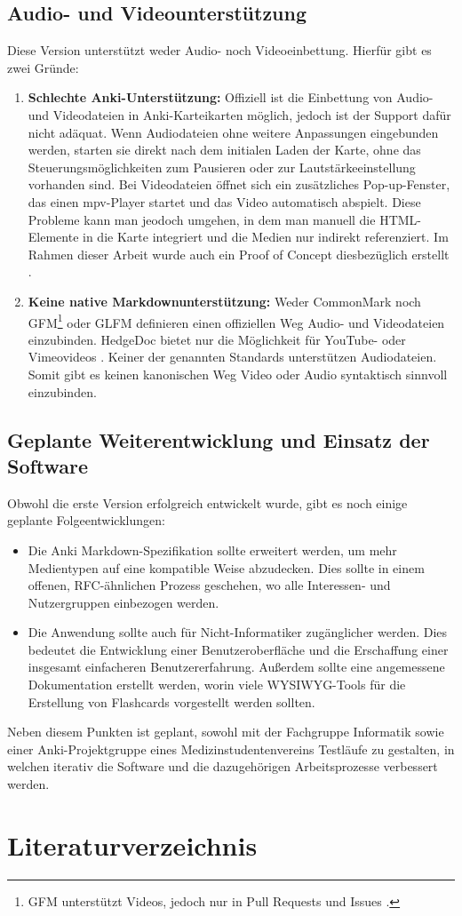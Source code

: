 \documentclass[ngerman]{article}
\begin{document}
\subsection{Audio- und Videounterst\"utzung}
Diese Version unterstützt weder Audio- noch Videoeinbettung. Hierfür gibt es zwei Gründe:
\begin{enumerate}
  \item \textbf{Schlechte Anki-Unterstützung:} Offiziell ist die Einbettung von Audio- und Videodateien in Anki-Karteikarten möglich, jedoch ist der Support dafür nicht adäquat. Wenn Audiodateien ohne weitere Anpassungen eingebunden werden, starten sie direkt nach dem initialen Laden der Karte, ohne das Steuerungsmöglichkeiten zum Pausieren oder zur Lautstärkeeinstellung vorhanden sind. Bei Videodateien öffnet sich ein zusätzliches Pop-up-Fenster, das einen mpv-Player startet und das Video automatisch abspielt. Diese Probleme kann man jeodoch umgehen, in dem man manuell die HTML-Elemente in die Karte integriert und die Medien nur indirekt referenziert. Im Rahmen dieser Arbeit wurde auch ein Proof of Concept diesbezüglich erstellt \cite{AnkiPoC}.
  \item \textbf{Keine native Markdownunterstützung:} Weder CommonMark noch GFM\footnote{GFM unterstützt Videos, jedoch nur in Pull Requests und Issues \cite{GFMVid}.} oder GLFM definieren einen offiziellen Weg Audio- und Videodateien einzubinden. HedgeDoc bietet nur die Möglichkeit für YouTube- oder Vimeovideos \cite{HFM2}. Keiner der genannten Standards unterstützen Audiodateien. Somit gibt es keinen kanonischen Weg Video oder Audio syntaktisch sinnvoll einzubinden.
\end{enumerate}
\subsection{Geplante Weiterentwicklung und Einsatz der Software}
Obwohl die erste Version erfolgreich entwickelt wurde, gibt es noch einige geplante Folgeentwicklungen:

\begin{itemize}
  \item Die Anki Markdown-Spezifikation sollte erweitert werden, um mehr Medientypen auf eine kompatible Weise abzudecken. Dies sollte in einem offenen, RFC-ähnlichen Prozess geschehen, wo alle Interessen- und Nutzergruppen einbezogen werden.
  \item Die Anwendung sollte auch für Nicht-Informatiker zugänglicher werden. Dies bedeutet die Entwicklung einer Benutzeroberfläche und die Erschaffung einer insgesamt einfacheren Benutzererfahrung. Außerdem sollte eine angemessene Dokumentation erstellt werden, worin viele WYSIWYG-Tools für die Erstellung von Flashcards vorgestellt werden sollten.
\end{itemize}

Neben diesem Punkten ist geplant, sowohl mit der Fachgruppe Informatik sowie einer Anki-Projektgruppe eines Medizinstudentenvereins Testläufe zu gestalten, in welchen iterativ die Software und die dazugehörigen Arbeitsprozesse verbessert werden.
\newpage
\section{Literaturverzeichnis}
\printbibliography
\end{document}
